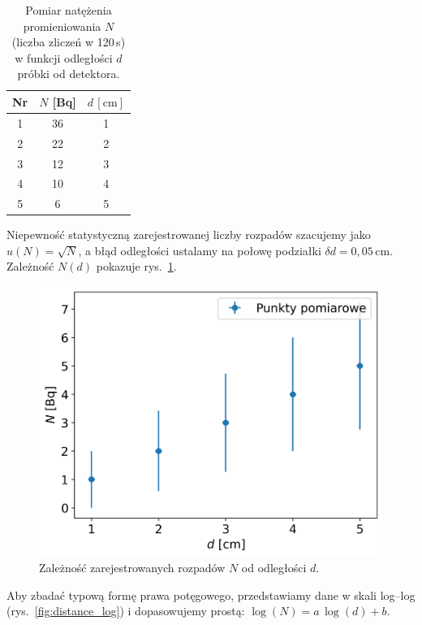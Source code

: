 \documentclass[12pt]{article}
\begin{document}
\begin{table}[H]
	\centering
	\begin{tabular}{c|c|c}
		\toprule
        Nr & $N$ [Bq] & $d\,[\mathrm{cm}]$ \\
		\midrule
		1 & 36 & 1 \\
		2 & 22 & 2 \\
		3 & 12 & 3 \\
		4 & 10 & 4 \\
		5 & 6  & 5 \\
		\bottomrule
	\end{tabular}
	\caption{Pomiar natężenia promieniowania $N$ (liczba zliczeń w 120\,s) w funkcji odległości $d$ próbki od detektora.}
	\label{tab:distance_measurments}
\end{table}

Niepewność statystyczną zarejestrowanej liczby rozpadów szacujemy jako \(u(N)=\sqrt{N}\), a błąd odległości ustalamy na połowę podziałki \(\delta d=0{,}05\,\mathrm{cm}\). Zależność \(N(d)\) pokazuje rys.~\ref{fig:distance}.

\begin{figure}[H]
	\centering
	\includegraphics[scale=0.7]{distance}
	\caption{Zależność zarejestrowanych rozpadów $N$ od odległości $d$.}
	\label{fig:distance}
\end{figure}

Aby zbadać typową formę prawa potęgowego, przedstawiamy dane w skali log–log (rys.~\ref{fig:distance_log}) i dopasowujemy prostą: \(\log(N)=a\,\log(d)+b\).
\end{document}
